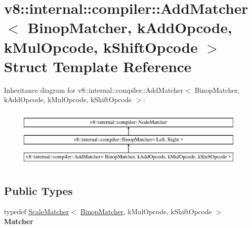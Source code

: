 \hypertarget{structv8_1_1internal_1_1compiler_1_1_add_matcher}{}\section{v8\+:\+:internal\+:\+:compiler\+:\+:Add\+Matcher$<$ Binop\+Matcher, k\+Add\+Opcode, k\+Mul\+Opcode, k\+Shift\+Opcode $>$ Struct Template Reference}
\label{structv8_1_1internal_1_1compiler_1_1_add_matcher}
Inheritance diagram for v8\+:\+:internal\+:\+:compiler\+:\+:Add\+Matcher$<$ Binop\+Matcher, k\+Add\+Opcode, k\+Mul\+Opcode, k\+Shift\+Opcode $>$\+:\begin{figure}[H]
\begin{center}
\leavevmode
\includegraphics[height=2.978723cm]{structv8_1_1internal_1_1compiler_1_1_add_matcher}
\end{center}
\end{figure}
\subsection*{Public Types}
\begin{DoxyCompactItemize}
\item 
typedef \hyperlink{structv8_1_1internal_1_1compiler_1_1_scale_matcher}{Scale\+Matcher}$<$ \hyperlink{structv8_1_1internal_1_1compiler_1_1_binop_matcher}{Binop\+Matcher}, k\+Mul\+Opcode, k\+Shift\+Opcode $>$ {\bfseries Matcher}\hypertarget{structv8_1_1internal_1_1compiler_1_1_add_matcher_a4e62b8fd72e616549f23062291b6fa5d}{}\label{structv8_1_1internal_1_1compiler_1_1_add_matcher_a4e62b8fd72e616549f23062291b6fa5d}

\end{DoxyCompactItemize}
